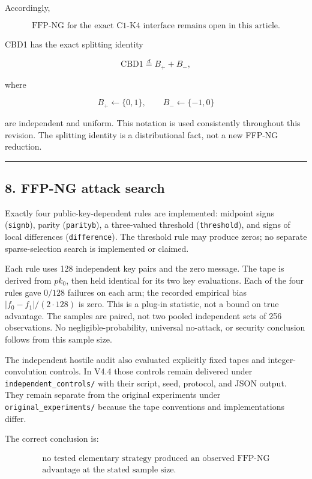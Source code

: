 \documentclass[11pt,a4paper]{article}
\begin{document}
Accordingly,

\[
\boxed{
\text{FFP-NG for the exact C1-K4 interface remains open in this article.}
}
\]

CBD1 has the exact splitting identity

\[
\mathrm{CBD1}
\overset d=
B_+ + B_-,
\]

where

\[
B_+\leftarrow\{0,1\},
\qquad
B_-\leftarrow\{-1,0\}
\]

are independent and uniform. This notation is used consistently throughout this revision. The splitting identity is a distributional fact, not a new FFP-NG reduction.

\begin{center}\rule{0.5\linewidth}{0.5pt}\end{center}

\subsection{8. FFP-NG attack search}\label{ffp-ng-attack-search}

Exactly four public-key-dependent rules are implemented: midpoint signs (\texttt{signb}), parity (\texttt{parityb}), a three-valued threshold (\texttt{threshold}), and signs of local differences (\texttt{difference}). The threshold rule may produce zeros; no separate sparse-selection search is implemented or claimed.

Each rule uses 128 independent key pairs and the zero message. The tape is derived from \(pk_0\), then held identical for its two key evaluations. Each of the four rules gave \(0/128\) failures on each arm; the recorded empirical bias \(|f_0-f_1|/(2\cdot128)\) is zero. This is a plug-in statistic, not a bound on true advantage. The samples are paired, not two pooled independent sets of 256 observations. No negligible-probability, universal no-attack, or security conclusion follows from this sample size.

The independent hostile audit also evaluated explicitly fixed tapes and integer-convolution controls. In V4.4 those controls remain delivered under \nolinkurl{independent_controls/} with their script, seed, protocol, and JSON output. They remain separate from the original experiments under \nolinkurl{original_experiments/} because the tape conventions and implementations differ.

The correct conclusion is:

\[
\boxed{
\begin{gathered}\text{no tested elementary strategy produced an observed FFP-NG}\\\text{advantage at the stated sample size.}\end{gathered}
}
\]
\end{document}
